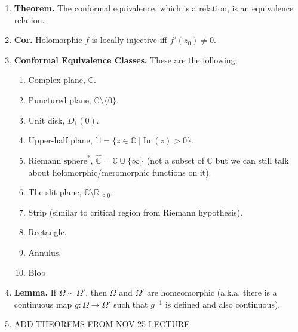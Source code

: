 \documentclass[10pt]{article}
\theoremstyle{definition}
\theoremstyle{named}
\begin{document}
\begin{enumerate}
\begin{enumerate}
    \end{enumerate}
    \item \textbf{Theorem. } The conformal equivalence, which is a relation, is an equivalence relation. 
    \item \textbf{Cor. } Holomorphic $f$ is locally injective iff $f'(z_0) \neq 0$.  
    \item \textbf{Conformal Equivalence Classes. } These are the following: 
    \begin{enumerate}
        \item Complex plane, $\mathbb{C}$. 
        \item Punctured plane, $\mathbb{C} \setminus \{0\}$. 
        \item Unit disk, $D_1(0)$. 
        \item Upper-half plane, $\mathbb{H} = \{z \in \mathbb{C} \mid \textrm{Im}(z) > 0\}$. 
        \item $\textrm{Riemann sphere}^*$, $\hat{\mathbb{C}} = \mathbb{C} \cup \{\infty\}$ (not a subset of $\mathbb{C}$ but we can still talk about holomorphic/meromorphic functions on it). 
        \item The slit plane, $\mathbb{C} \setminus \mathbb{R}_{\leq 0}$. 
        \item Strip (similar to critical region from Riemann hypothesis). 
        \item Rectangle. 
        \item Annulus. 
        \item Blob
    \end{enumerate}
    \item \textbf{Lemma. } If $\Omega \sim \Omega'$, then $\Omega$ and $\Omega'$ are homeomorphic (a.k.a. there is a continuous map $g: \Omega \to \Omega'$ such that $g^{-1}$ is defined and also continuous). 
    \item ADD THEOREMS FROM NOV 25 LECTURE
\end{enumerate}
\end{document}
